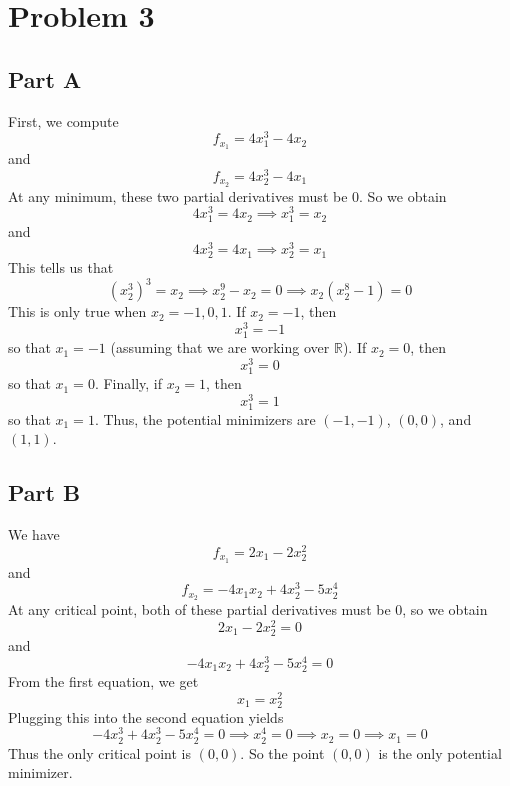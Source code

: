 \documentclass[12pt]{article}
\begin{document}
\section*{Problem 3}
\subsection*{Part A}
First, we compute
\[
f_{x_1} = 4x_1^3 - 4x_2
\] and 
\[
f_{x_2} = 4x_2^3 - 4x_1
\] At any minimum, these two partial derivatives must be $0$. So we obtain
\[
4x_1^3 = 4x_2 \implies x_1^3 = x_2
\] and
\[
4x_2^3 = 4x_1 \implies x_2^3 = x_1
\] This tells us that
\[
(x_2^3)^3 = x_2 \implies x_2^9 - x_2 = 0 \implies x_2(x_2^8 - 1) = 0
\] This is only true when $x_2 = -1,0,1$. If $x_2 = -1$, then 
\[
x_1^3 = -1
\] so that $x_1 = -1$ (assuming that we are working over $\mathbb{R}$). If $x_2=0$, then
\[
x_1^3 = 0
\] so that $x_1 = 0$. Finally, if $x_2 = 1$, then
\[
x_1^3 = 1
\] so that $x_1 = 1$. Thus, the potential minimizers are $(-1,-1)$, $(0,0)$, and $(1,1)$.
\newpage
\subsection*{Part B}
We have
\[
f_{x_1} = 2x_1 - 2x_2^2
\] and
\[
f_{x_2} = -4x_1x_2 + 4x_2^3 - 5x_2^4
\] At any critical point, both of these partial derivatives must be $0$, so we obtain
\[
2x_1 - 2x_2^2 = 0
\] and
\[
-4x_1x_2 + 4x_2^3 - 5x_2^4 = 0
\] From the first equation, we get
\[
x_1 = x_2^2
\] Plugging this into the second equation yields
\[
-4x_2^3 + 4x_2^3 - 5x_2^4 = 0 \implies x_2^4 = 0 \implies x_2 = 0 \implies x_1 = 0
\]  Thus the only critical point is $(0,0)$. So the point $(0,0)$ is the only potential minimizer.
\newpage
\end{document}
